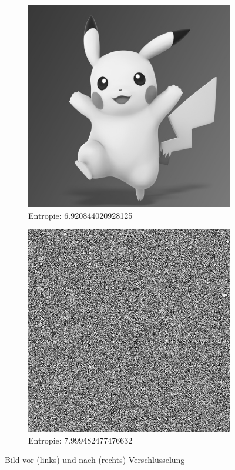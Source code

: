 \begin{figure}
	\centering

	\begin{subfigure}{0.35\textwidth}
		\includegraphics[width=\textwidth]{../1/3/gray_6.920844020928125_pikachu.jpg}
		\caption{Entropie: 6.920844020928125}
	\end{subfigure}
	\hfill
	\begin{subfigure}{0.35\textwidth}
		\includegraphics[width=\textwidth]{../1/3/encrypted_7.999482477476632_pikachu.jpg}
		\caption{Entropie: 7.999482477476632}
	\end{subfigure}

	\caption{Bild vor (links) und nach (rechts) Verschlüsselung}
	\label{fig:pika}
\end{figure}

